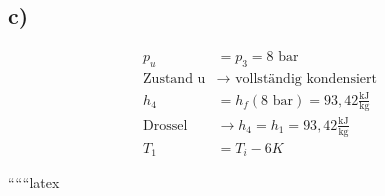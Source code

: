

\subsection*{c)}

\begin{align*}
p_u &= p_3 = 8 \text{ bar} \\
\text{Zustand u} &\rightarrow \text{ vollständig kondensiert} \\
h_4 &= h_f (8 \text{ bar}) = 93,42 \frac{\text{kJ}}{\text{kg}} \\
\text{Drossel} &\rightarrow h_4 = h_1 = 93,42 \frac{\text{kJ}}{\text{kg}} \\
T_1 &= T_i - 6K
\end{align*}

``````latex